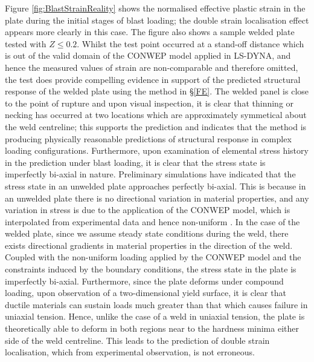 Figure \ref{fig:BlastStrainReality} shows the normalised effective plastic strain in the plate during the initial stages of blast loading; the double strain localisation effect appears more clearly in this case. The figure also shows a sample welded plate tested with $Z\leq0.2$. Whilst the test point occurred at a stand-off distance which is out of the valid domain of the CONWEP model applied in LS-DYNA, and hence the measured values of strain are non-comparable and therefore omitted, the test does provide compelling evidence in support of the predicted structural response of the welded plate using the method in \S\ref{FE}. The welded panel is close to the point of rupture and upon visual inspection, it is clear that thinning or necking has occurred at two locations which are approximately symmetical about the weld centreline; this supports the prediction and indicates that the method is producing physically reasonable predictions of structural response in complex loading configurations. Furthermore, upon examination of elemental stress history in the prediction under blast loading, it is clear that the stress state is imperfectly bi-axial in nature. Preliminary simulations have indicated that the stress state in an unwelded plate approaches perfectly bi-axial. This is because in an unwelded plate there is no directional variation in material properties, and any variation in stress is due to the application of the CONWEP model, which is interpolated from experimental data and hence non-uniform \cite{Spranghers2013}. In the case of the welded plate, since we assume steady state conditions during the weld, there exists directional gradients in material properties in the direction of the weld. Coupled with the non-uniform loading applied by the CONWEP model and the constraints induced by the boundary conditions, the stress state in the plate is imperfectly bi-axial. Furthermore, since the plate deforms under compound loading, upon observation of a two-dimensional yield surface, it is clear that ductile materials can sustain loads much greater than that which causes failure in uniaxial tension. Hence, unlike the case of a weld in uniaxial tension, the plate is theoretically able to deform in both regions near to the hardness minima either side of the weld centreline. This leads to the prediction of double strain localisation, which from experimental observation, is not erroneous. 

